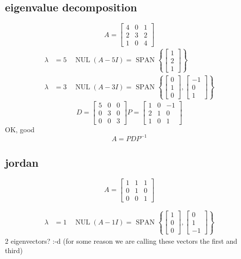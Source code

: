 \documentclass[12pt,a4paper]{article}
\begin{document}
\subsection*{eigenvalue  decomposition}
\label{sec-5-1}
$$
A=\left[\begin{array}{lll}{4} & {0} & {1} \\ {2} & {3} & {2} \\ {1} & {0} & {4}\end{array}\right]
$$
\begin{align*}
\lambda&=5 \quad \operatorname{NUL}(A-5 I) =\text { SPAN }\left\{\left[\begin{array}{l}{1} \\ {2} \\ {1}\end{array}\right]\right\} \\
\lambda&=3 \quad \operatorname{NUL}(A-3 I) = \text { SPAN }\left\{\left[\begin{array}{l}{0} \\ {1} \\ {0}\end{array}\right],\left[\begin{array}{c}{-1} \\ {0} \\ {1}\end{array}\right]\right\}
\end{align*}
$$
D=\left[\begin{array}{lll}{5} & {0} & {0} \\ {0} & {3} & {0} \\ {0} & {0} & {3}\end{array}\right]
P=\left[\begin{array}{llc}{1} & {0} & {-1} \\ {2} & {1} & {0} \\ {1} & {0} & {1}\end{array}\right]
$$
OK, good
$$
A=P D P^{-1}
$$
\subsection*{jordan}
\label{sec-5-2}
$$
A=\left[\begin{array}{lll}{1} & {1} & {1} \\ {0} & {1} & {0} \\ {0} & {0} & {1}\end{array}\right]
$$

\begin{align*}
\lambda&=1 \quad \operatorname{NUL}(A-1 I) = \text { SPAN }\left\{\left[\begin{array}{l}{1} \\ {0} \\ {0}\end{array}\right],\left[\begin{array}{c}{0} \\ {1} \\ {-1}\end{array}\right]\right\}
\end{align*}
2 eigenvectors? :-d    (for some reason we are calling these vectors the first and third)
\end{document}
